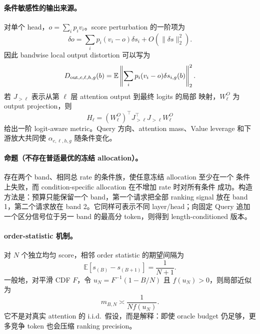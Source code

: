 \paragraph{条件敏感性的输出来源。}
对单个 head，$o=\sum_ip_iv_i$。score perturbation 的一阶项为
\begin{equation}
 \delta o=\sum_ip_i(v_i-o)\delta s_i
 +O(\|\delta s\|_2^2).
 \label{eq:attention-local-jacobian}
\end{equation}
因此 bandwise local output distortion 可以写为
\begin{equation}
 D_{{\rm out},c,\ell,h,g}(b)=
 \mathbb E\left\|
 \sum_ip_i(v_i-o)\delta s_{i,g}(b)
 \right\|_2^2 .
 \label{eq:output-aware-band-distortion}
\end{equation}
若 $J_{>\ell}$ 表示从第 $\ell$ 层 attention output 到最终 logits 的局部
映射，$W_\ell^O$ 为 output projection，则
\begin{equation}
 H_\ell=(W_\ell^O)^\top J_{>\ell}^\top
 J_{>\ell}W_\ell^O
 \label{eq:layer-output-metric}
\end{equation}
给出一阶 logit-aware metric。Query 方向、attention mass、Value leverage
和下游放大共同使 $\alpha_{c,\ell,h,g}$ 随条件变化。

\paragraph{命题（不存在普适最优的冻结 allocation）。}
存在两个 band、相同总 rate 的条件族，使任意冻结 allocation 至少在一个
条件上失败，而 condition-specific allocation 在不增加 rate 时对所有条件
成功。构造方法是：预算只能保留一个 band，第一个请求把全部 ranking signal
放在 band 1，第二个请求放在 band 2。它同样可表示不同 layer/head；向固定
Query 追加一个区分信号位于另一 band 的最高分 token，则得到 length-conditioned
版本。

\paragraph{order-statistic 机制。}
对 $N$ 个独立均匀 score，相邻 order statistic 的期望间隔为
\begin{equation}
 \mathbb E[s_{(B)}-s_{(B+1)}]=\frac1{N+1}.
 \label{eq:uniform-order-gap}
\end{equation}
一般地，对平滑 CDF $F$，令
$u_N=F^{-1}(1-B/N)$ 且 $f(u_N)>0$，则局部近似为
\begin{equation}
 m_{B,N}\asymp\frac1{Nf(u_N)}.
 \label{eq:general-order-gap}
\end{equation}
它不是对真实 attention 的 i.i.d.\ 假设，而是解释：即使 oracle budget
仍足够，更多竞争 token 也会压缩 ranking precision。

